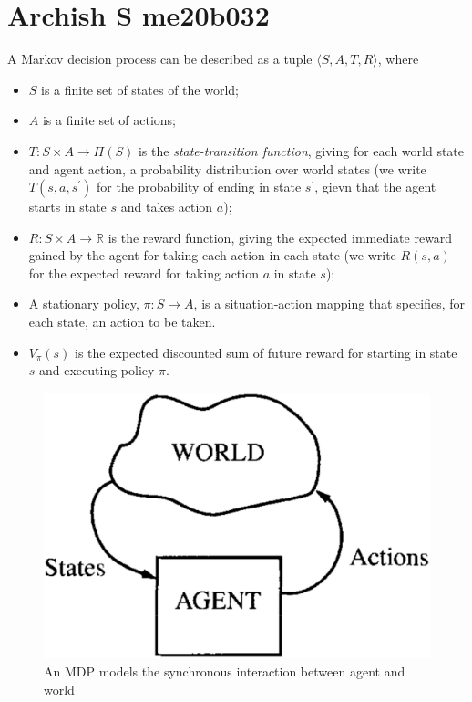 \section{Archish S me20b032}
A Markov decision process \cite{POMDP} can be described as a tuple $ \langle S, A, T, R \rangle $, where
\begin{itemize}
	\item $S$ is a finite set of states of the world;
	\item $A$ is a finite set of actions;
	\item $T : S \times A \rightarrow \Pi(S)$ is the \textit{state-transition function}, giving for each world state and agent action, a probability distribution over world states (we write $T(s,a,s^\prime)$ for the probability of ending in state $s^\prime$, gievn that the agent starts in state $s$ and takes action $a$);
	\item $R : S \times A \rightarrow \mathbb{R}$ is the reward function, giving the expected immediate reward gained by the agent for taking each action in each state (we write $R(s,a)$ for the expected reward for taking action $a$ in state $s$);
	\item A stationary policy, $ \pi : S \rightarrow A $, is a situation-action mapping that specifies, for each state, an action to be taken.
	\item $V_{\pi}(s)$ is the expected discounted sum of future reward for starting in state $s$ and executing policy $\pi$.
\end{itemize}

\begin{center}
\begin{figure}[h]
	\includegraphics[width=\linewidth]{me20b032/me20b032.eps}
  	\caption{An MDP models the synchronous interaction between agent and world}
	\label{fig:MDP}
\end{figure}
\end{center}

